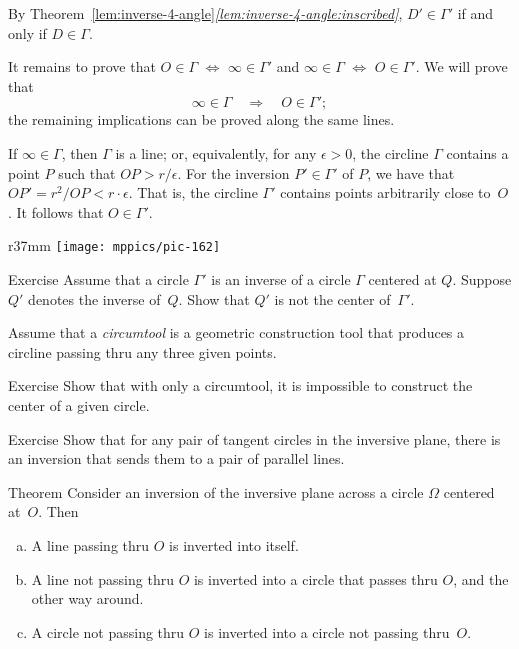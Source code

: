 By Theorem~\ref{lem:inverse-4-angle}\textit{\ref{lem:inverse-4-angle:inscribed}},
$D'\in\Gamma'$ if and only if $D\in\Gamma$.

It remains to prove that 
$O\in \Gamma$ $\Leftrightarrow$ $\infty\in\Gamma'$ 
and 
$\infty\in \Gamma$ $\Leftrightarrow$ $O\in\Gamma'$.
We will prove that
$$\infty\in \Gamma
\quad
\Longrightarrow
\quad
O\in\Gamma';$$
the remaining implications can be proved along the same lines.

If $\infty\in\Gamma$, then $\Gamma$ is a line;
or, equivalently, for any $\epsilon>0$, the circline $\Gamma$ contains a point $P$ such that $OP>r/\epsilon$.
For the inversion $P'\in\Gamma'$ of $P$, we have that $OP'=r^2/OP<r\cdot \epsilon$.
That is, the circline $\Gamma'$ contains points arbitrarily close to~$O$.
It follows that $O\in \Gamma'$.
\qeds

{

\begin{wrapfigure}{r}{37mm}
\vskip-7mm
\centering
\texttt{[image: mppics/pic-162]}
\end{wrapfigure}

\begin{thm}{Exercise}\label{ex:inv-center not=center-inv}
Assume that a circle $\Gamma'$ is an inverse of a circle $\Gamma$ centered at $Q$.
Suppose $Q'$ denotes the inverse of~$Q$.
Show that $Q'$ is not the center of~$\Gamma'$.
\end{thm}

Assume that a \emph{circumtool} is a geometric construction tool 
that produces a circline passing thru any three given points.

}

\begin{thm}{Exercise}\label{ex:circumtool}
Show that with only a circumtool,
it is impossible to construct the center of a given circle.
\end{thm}


\begin{thm}{Exercise}\label{ex:tangent-circ->parallels}
Show that for any pair of tangent circles in the inversive plane, there is an inversion that sends them to a pair of parallel lines.
\end{thm}

\begin{thm}{Theorem}\label{thm:inverse}
Consider an inversion of the inversive plane across a circle $\Omega$ centered at~$O$. 
Then 
\begin{enumerate}[(a)]
\item\label{thm:inverse:line-line}
A line passing thru $O$ is inverted into itself.
\item\label{thm:inverse:line} 
A line not passing thru $O$ is inverted into a circle that passes thru $O$, and the other way around.
\item\label{thm:inverse:circle} 
A circle not passing thru $O$ 
is inverted into a circle not passing thru~$O$. 
\end{enumerate}
\end{thm}


